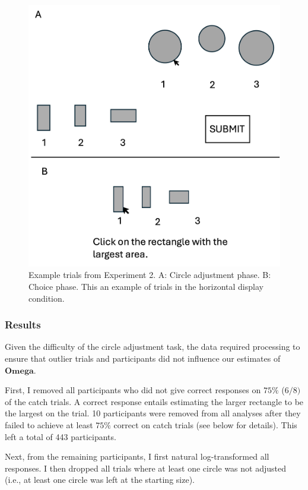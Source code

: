 {{\begin{figure}
   \includegraphics[width=\linewidth]{figures/circle_exp_display.jpg}
   \caption{Example trials from Experiment 2. A: Circle adjustment phase. B: Choice phase. This an example of trials in the horizontal display condition.}
   \label{fig:circle_exp_display}
\end{figure}

\subsubsection{Results}
Given the difficulty of the circle adjustment task, the data required processing to ensure that outlier trials and participants did not influence our estimates of $\mathbf{Omega}$.

First, I removed all participants who did not give correct responses on $75\%$ ($6/8)$ of the catch trials. A correct response entails estimating the larger rectangle to be the largest on the trial. 10 participants were removed from all analyses after they failed to achieve at least $75\%$ correct on catch trials (see below for details). This left a total of 443 participants.

Next, from the remaining participants, I first natural log-transformed all responses. I then dropped all trials where at least one circle was not adjusted (i.e., at least one circle was left at the starting size).

}}
